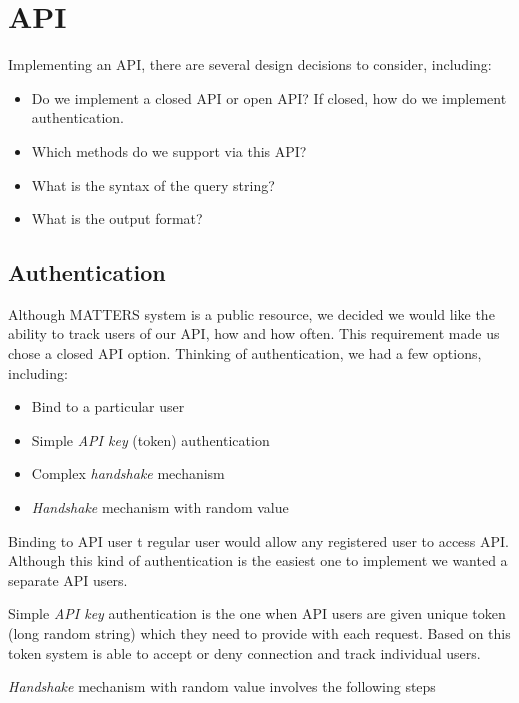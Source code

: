 	\section{API}
			
			Implementing an API, there are several design decisions to consider, including:
			\begin{itemize}
				\item
					Do we implement a closed API or open API? 
					If closed, how do we implement authentication.
				\item
					Which methods do we support via this API?
				\item
			        What is the syntax of the query string? 	
				\item
				    What is the output format?
			\end{itemize}
			
			\subsection{Authentication}
				
				Although MATTERS system is a public resource, 
				we decided we would like the ability to track users of our API, how and how often. 
				This requirement made us chose a closed API option. 
				Thinking of authentication, we had a few options, including:
				
				\begin{itemize}
					\item
						Bind to a particular user
					\item
						Simple \emph{API key} (token) authentication
					\item
						Complex \emph{handshake} mechanism					
					\item
						\emph{Handshake} mechanism with random value
				\end{itemize}
				
				Binding to API user t regular user would allow any registered user to access API. 
				Although this kind of authentication is the easiest one to implement we wanted a separate API users.
				
				Simple  \emph{API key} authentication is the one when API users are given unique token 
				(long random string) which they need to provide with each request. 
				Based on this token system is able to accept or deny connection and track individual users.
				
				\emph{Handshake} mechanism with random value involves the following steps
				
